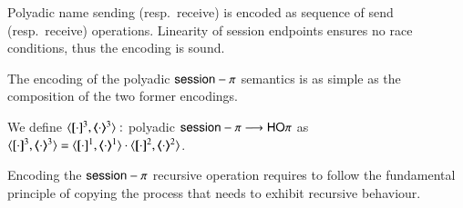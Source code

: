 
Polyadic name sending (resp.\ receive) is encoded as sequence of
send (resp.\ receive) operations. Linearity of session endpoints
ensures no race conditions, thus the encoding is sound.

The encoding of the polyadic $\mathsf{session}-\pi$ semantics is as simple as the
composition of the two former encodings.

\begin{definition}
	We define $\encod{\cdot}{\cdot}{3}: $ polyadic $\mathsf{session}-\pi \longrightarrow \mathsf{HO}\pi$
	as $\encod{\cdot}{\cdot}{3} = \encod{\cdot}{\cdot}{1} \cat \encod{\cdot}{\cdot}{2}$.	
\end{definition}

Encoding the $\mathsf{session}-\pi$ recursive operation requires to follow the fundamental
principle of copying the process that needs to exhibit recursive behaviour.



